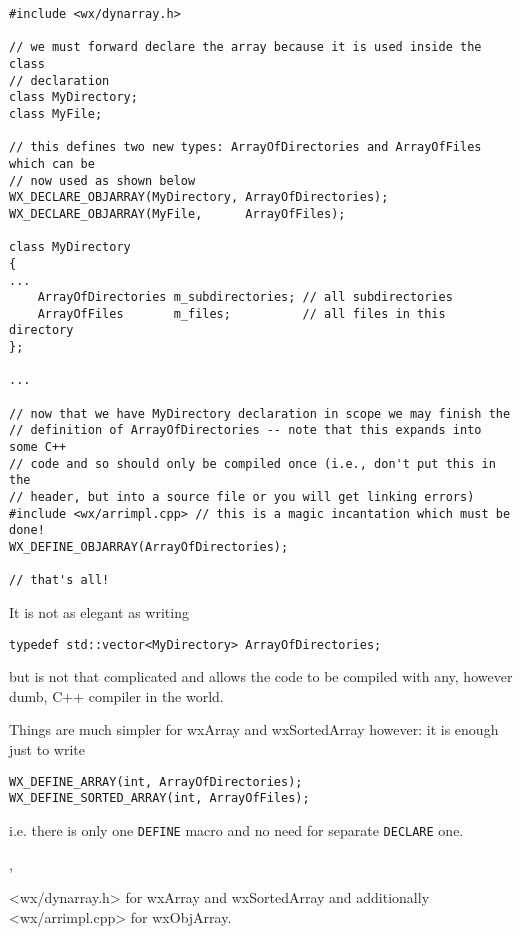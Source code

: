 \begin{verbatim}
#include <wx/dynarray.h>

// we must forward declare the array because it is used inside the class
// declaration
class MyDirectory;
class MyFile;

// this defines two new types: ArrayOfDirectories and ArrayOfFiles which can be
// now used as shown below
WX_DECLARE_OBJARRAY(MyDirectory, ArrayOfDirectories);
WX_DECLARE_OBJARRAY(MyFile,      ArrayOfFiles);

class MyDirectory
{
...
    ArrayOfDirectories m_subdirectories; // all subdirectories
    ArrayOfFiles       m_files;          // all files in this directory
};

...

// now that we have MyDirectory declaration in scope we may finish the
// definition of ArrayOfDirectories -- note that this expands into some C++
// code and so should only be compiled once (i.e., don't put this in the
// header, but into a source file or you will get linking errors)
#include <wx/arrimpl.cpp> // this is a magic incantation which must be done!
WX_DEFINE_OBJARRAY(ArrayOfDirectories);

// that's all!
\end{verbatim}

It is not as elegant as writing

\begin{verbatim}
typedef std::vector<MyDirectory> ArrayOfDirectories;
\end{verbatim}

but is not that complicated and allows the code to be compiled with any, however
dumb, C++ compiler in the world.

Things are much simpler for wxArray and wxSortedArray however: it is enough
just to write

\begin{verbatim}
WX_DEFINE_ARRAY(int, ArrayOfDirectories);
WX_DEFINE_SORTED_ARRAY(int, ArrayOfFiles);
\end{verbatim}

i.e. there is only one {\tt DEFINE} macro and no need for separate
{\tt DECLARE} one.



, 


<wx/dynarray.h> for wxArray and wxSortedArray and additionally <wx/arrimpl.cpp>
for wxObjArray.

